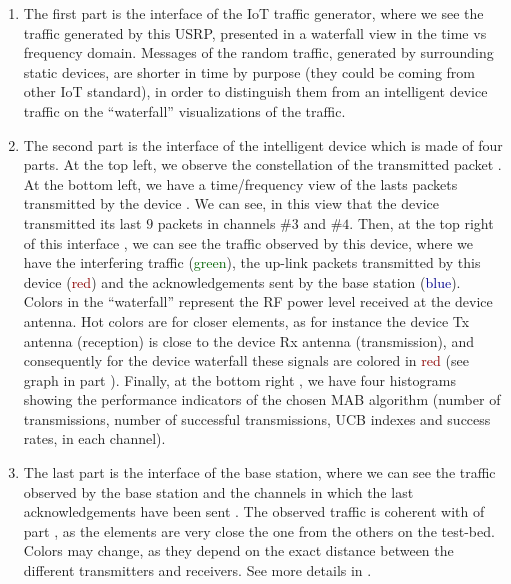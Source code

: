 \begin{enumerate}[label=\textcolor{darkred}{\protect\boldcircled{\arabic*}},leftmargin=6mm]
    \item %
The first part is the interface of the IoT traffic generator, where we see the traffic generated by this USRP, presented in a waterfall view in the time vs frequency domain.
Messages of the random traffic, generated by surrounding static devices, are shorter in time by purpose (they could be coming from other IoT standard), in order to distinguish them from an intelligent device traffic on the ``waterfall'' visualizations of the traffic.

    \item %
The second part is the interface of the intelligent device which is made of four parts.
At the top left, we observe the constellation of the transmitted packet .
At the bottom left, we have a time/frequency view of the lasts packets transmitted by the device .
We can see, in this view that the device transmitted its last $9$ packets in channels $\#3$ and $\#4$.
Then, at the top right of this interface , we can see the traffic observed by this device, where we have the interfering traffic (\textcolor{darkgreen}{green}), the up-link packets transmitted by this device (\textcolor{darkred}{red}) and the acknowledgements sent by the base station (\textcolor{darkblue}{blue}).
Colors in the ``waterfall'' represent the RF power level received at the device antenna. Hot colors are for closer elements, as for instance the device Tx antenna (reception) is close to the device Rx antenna (transmission), and consequently for the device waterfall these signals are colored in \textcolor{darkred}{red} (see graph  in part \textcolor{darkred}{}).
Finally, at the bottom right , we have four histograms showing the performance indicators of the chosen MAB algorithm (number of transmissions, number of successful transmissions, UCB indexes and success rates, in each channel).

    \item %
The last part is the interface of the base station, where we can see the traffic observed by the base station  and the channels in which the last acknowledgements have been sent .
The observed traffic is coherent with  of part \textcolor{darkred}{}, as the elements are very close the one from the others on the test-bed. Colors may change, as they depend on the exact distance between the different transmitters and receivers. See more details in \cite{MoyBesson2019}.
\end{enumerate}


